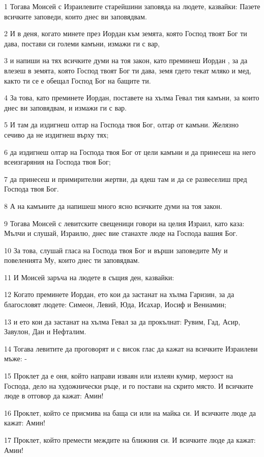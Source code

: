 \par 1 Тогава Моисей с Израилевите старейшини заповяда на людете, казвайки: Пазете всичките заповеди, които днес ви заповядвам.
\par 2 И в деня, когато минете през Иордан към земята, която Господ твоят Бог ти дава, постави си големи камъни, измажи ги с вар,
\par 3 и напиши на тях всичките думи на тоя закон, като преминеш Иордан , за да влезеш в земята, която Господ твоят Бог ти дава, земя гдето текат мляко и мед, както ти се е обещал Господ Бог на бащите ти.
\par 4 За това, като преминете Иордан, поставете на хълма Гевал тия камъни, за които днес ви заповядвам, и измажи ги с вар.
\par 5 И там да издигнеш олтар на Господа твоя Бог, олтар от камъни. Желязно сечиво да не издигнеш върху тях;
\par 6 да издигнеш олтар на Господа твоя Бог от цели камъни и да принесеш на него всеизгаряния на Господа твоя Бог;
\par 7 да принесеш и примирителни жертви, да ядеш там и да се развеселиш пред Господа твоя Бог.
\par 8 А на камъните да напишеш много ясно всичките думи на тоя закон.
\par 9 Тогава Моисей с левитските свещеници говори на целия Израил, като каза: Мълчи и слушай, Израилю, днес вие станахте люде на Господа вашия Бог.
\par 10 За това, слушай гласа на Господа твоя Бог и върши заповедите Му и повеленията Му, които днес ти заповядвам.
\par 11 И Моисей заръча на людете в същия ден, казвайки:
\par 12 Когато преминете Иордан, ето кои да застанат на хълма Гаризин, за да благословят людете: Симеон, Левий, Юда, Исахар, Иосиф и Вениамин;
\par 13 и ето кои да застанат на хълма Гевал за да прокълнат: Рувим, Гад, Асир, Завулон, Дан и Нефталим.
\par 14 Тогава левитите да проговорят и с висок глас да кажат на всичките Израилеви мъже: -
\par 15 Проклет да е оня, който направи изваян или излеян кумир, мерзост на Господа, дело на художнически ръце, и го постави на скрито място. И всичките люде в отговор да кажат: Амин!
\par 16 Проклет, който се присмива на баща си или на майка си. И всичките люде да кажат: Амин!
\par 17 Проклет, който премести междите на ближния си. И всичките люде да кажат: Амин!
